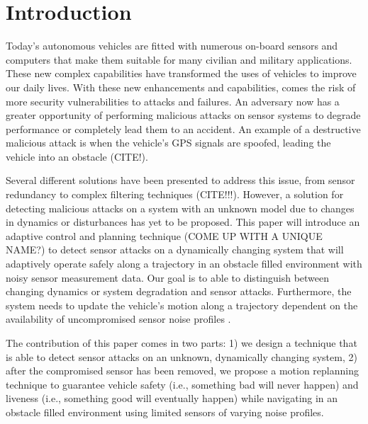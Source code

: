 
\section{Introduction} \label{sec:introduction}

Today's autonomous vehicles are fitted with numerous on-board sensors and computers that make them suitable for many civilian and military applications. These new complex capabilities have transformed the uses of vehicles to improve our daily lives. With these new enhancements and capabilities, comes the risk of more security vulnerabilities to attacks and failures. An adversary now has a greater opportunity of performing malicious attacks on sensor systems to degrade performance or completely lead them to an accident. An example of a destructive malicious attack is when the vehicle's GPS signals are spoofed, leading the vehicle into an obstacle (CITE!).

Several different solutions have been presented to address this issue, from sensor redundancy to complex filtering techniques (CITE!!!). However, a solution for detecting malicious attacks on a system with an unknown model due to changes in dynamics or disturbances has yet to be proposed. This paper will introduce an adaptive control and planning technique (COME UP WITH A UNIQUE NAME?) to detect sensor attacks on a dynamically changing system that will adaptively operate safely along a trajectory in an obstacle filled environment with noisy sensor measurement data. Our goal is to able to distinguish between changing dynamics or system degradation and sensor attacks. Furthermore, the system needs to update the vehicle's motion along a trajectory dependent on the availability of uncompromised sensor noise profiles 
.

The contribution of this paper comes in two parts: 1) we design a technique that is able to detect sensor attacks on an unknown, dynamically changing system, 2) after the compromised sensor has been removed, we propose a motion replanning technique to guarantee vehicle safety (i.e., something bad will never happen) and liveness (i.e., something good will eventually happen) while navigating in an obstacle filled environment using limited sensors of varying noise profiles. 

